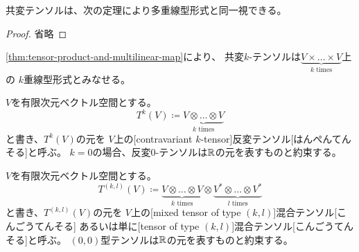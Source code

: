 \documentclass[report]{jlreq}
\begin{document}
共変テンソルは、次の定理により多重線型形式と同一視できる。


\begin{proof}
    省略
\end{proof}

\begin{remark}
    \cref{thm:tensor-product-and-multilinear-map}により、
    共変$k$-テンソルは$\underbrace{V \times \dots \times V}_{k \text{ times}}$上の
    $k$重線型形式とみなせる。
\end{remark}

\begin{definition}[反変テンソル]
    $V$を有限次元ベクトル空間とする。
    \begin{equation}
        T^k(V) \coloneqq \underbrace{V \otimes \dots \otimes V}_{k \text{ times}}
    \end{equation}
    と書き、$T^k(V)$の元を
    $V$上の[contravariant $k$-tensor]{反変テンソル}[はんぺんてんそる]と呼ぶ。
    $k = 0$の場合、反変$0$-テンソルは$\mathbb{R}$の元を表すものと約束する。
\end{definition}

\begin{definition}[混合テンソル]
    $V$を有限次元ベクトル空間とする。
    \begin{equation}
        T^{(k, l)}(V)
            \coloneqq \underbrace{V \otimes \dots \otimes V}_{k \text{ times}}
            \otimes \underbrace{V^* \otimes \dots \otimes V^*}_{l \text{ times}}
    \end{equation}
    と書き、$T^{(k, l)}(V)$の元を
    $V$上の[mixed tensor of type $(k, l)$]{混合テンソル}[こんごうてんそる]
    あるいは単に[tensor of type $(k, l)$]{混合テンソル}[こんごうてんそる]と呼ぶ。
    $(0, 0)$型テンソルは$\mathbb{R}$の元を表すものと約束する。
\end{definition}
\end{document}

